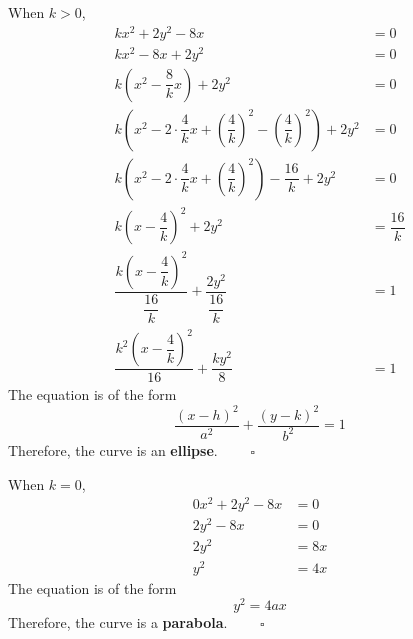 \documentclass{report}
\newcommand{\eos}{ \qquad \square}
\begin{document}
\begin{enumerate}
          When $k>0$,
          \begin{align*}
              kx^2+2y^2-8x                                                                                               & = 0             \\
              kx^2 - 8x + 2y^2                                                                                           & = 0             \\
              k\left(x^2 - \dfrac{8}{k}x\right) + 2y^2                                                                   & = 0             \\
              k\left(x^2 - 2\cdot\dfrac{4}{k}x + \left(\dfrac{4}{k}\right)^2 - \left(\dfrac{4}{k}\right)^2\right) + 2y^2 & = 0             \\
              k\left(x^2 - 2\cdot\dfrac{4}{k}x + \left(\dfrac{4}{k}\right)^2\right) - \dfrac{16}{k} + 2y^2               & = 0             \\
              k\left(x - \dfrac{4}{k}\right)^2 + 2y^2                                                                    & = \dfrac{16}{k} \\
              \dfrac{k\left(x - \dfrac{4}{k}\right)^2}{\dfrac{16}{k}} + \dfrac{2y^2}{\dfrac{16}{k}}                      & = 1             \\
              \dfrac{k^2\left(x - \dfrac{4}{k}\right)^2}{16} + \dfrac{ky^2}{8}                                           & = 1
          \end{align*}
          The equation is of the form
          \begin{equation*}
              \frac{(x-h)^2}{a^2} + \frac{(y-k)^2}{b^2} = 1
          \end{equation*}
          Therefore, the curve is an \textbf{ellipse}. $\eos$

          When $k=0$,
          \begin{align*}
              0x^2+2y^2-8x & = 0  \\
              2y^2-8x      & = 0  \\
              2y^2         & = 8x \\
              y^2          & = 4x
          \end{align*}
          The equation is of the form
          \begin{equation*}
              y^2 = 4ax
          \end{equation*}
          Therefore, the curve is a \textbf{parabola}. $\eos$


\end{enumerate}
\end{document}
